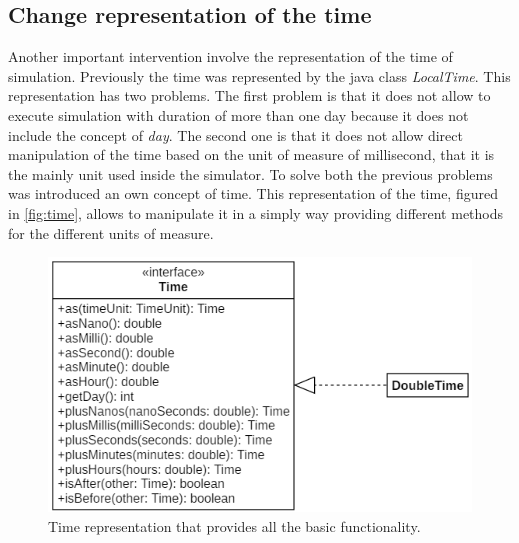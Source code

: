 \subsection{Change representation of the time}
Another important intervention involve the representation of the time of simulation. Previously the time was represented by the java class \mbox{\textit{LocalTime}}. This representation has two problems. 
The first problem is that it does not allow to execute simulation with duration of more than one day because it does not include the concept of \textit{day}. 
The second one is that it does not allow direct manipulation of the time based on the unit of measure of millisecond, that it is the mainly unit used inside the simulator.
To solve both the previous problems was introduced an own concept of time. 
This representation of the time, figured in \autoref{fig:time}, allows to manipulate it in a simply way providing different methods for the different units of measure.
\begin{figure}[h]
    \centering
    \includegraphics{figures/time.png}
    \caption[Time representation in DingNet simulator]{Time representation that provides all the basic functionality.}
    \label{fig:time}
\end{figure}


